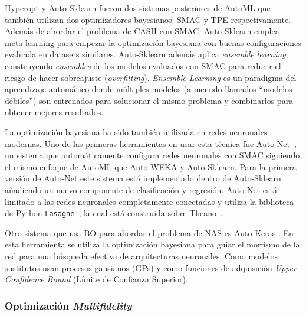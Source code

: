 Hyperopt \cite{bergstra2013hyperopt} y Auto-Sklearn \cite{fuerer2015efficient} fueron dos sistemas posteriores de AutoML que también utilizan dos optimizadores bayesianos: SMAC y TPE respectivamente. Además de abordar el problema de CASH con SMAC, Auto-Sklearn emplea meta-learning para empezar la optimización bayesiana con buenas configuraciones \cite{fuerer2015initializing} evaluada en datasets similares. Auto-Sklearn además aplica \textit{ensemble learning}, construyendo \textit{ensembles} de los modelos evaluados con SMAC \cite{hutter2011sequential} para reducir el riesgo de hacer sobreajuste (\textit{overfitting}). \textit{Ensemble Learning} es un paradigma del aprendizaje automático donde múltiples modelos (a menudo llamados ``modelos débiles'') son entrenados para solucionar el mismo problema y combinarlos para obtener mejores resultados.

La optimización bayesiana ha sido también utilizada en redes neuronales modernas. Uno de las primeras herramientas en usar esta técnica fue Auto-Net~\cite{mendoza2016towards}, un sistema que automáticamente configura redes neuronales con SMAC siguiendo el mismo enfoque de AutoML que Auto-WEKA y Auto-Sklearn. Para la primera versión de Auto-Net este sistema está implementado dentro de Auto-Sklearn añadiendo un nuevo componente de clasificación y regresión. Auto-Net está limitado a las redes neuronales completamente conectadas y utiliza la biblioteca de Python \texttt{Lasagne}~\cite{lasagne}, la cual está construida sobre Theano~\cite{theano2016theano}.

Otro sistema que usa BO para abordar el problema de NAS es Auto-Keras \cite{jin2019auto}. En esta herramienta se utiliza la optimización bayesiana para guiar el morfismo de la red para una búsqueda efectiva de arquitecturas neuronales. Como modelos sustitutos usan procesos gausianos (GPs) y como funciones de adquisición \textit{Upper Confidence Bound} (Límite de Confianza Superior).

\subsubsection{Optimización \textit{Multifidelity}}



